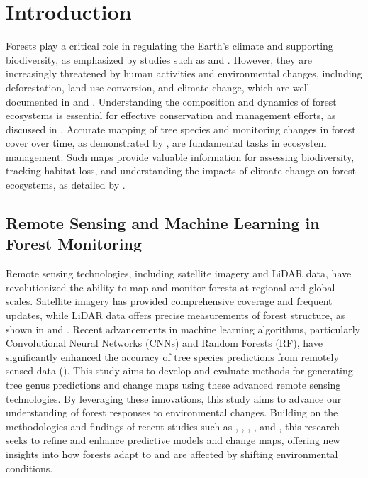 \chapter{Introduction}
\label{chapter:intro}

Forests play a critical role in regulating the Earth's climate and supporting biodiversity, as emphasized by studies such as \cite{bonan2008forests} and \cite{watson2018intact}. However, they are increasingly threatened by human activities and environmental changes, including deforestation, land-use conversion, and climate change, which are well-documented in \cite{fao2020gfra} and \cite{hansen2013forestcover}. Understanding the composition and dynamics of forest ecosystems is essential for effective conservation and management efforts, as discussed in \cite{turner2003remotesensing}. Accurate mapping of tree species and monitoring changes in forest cover over time, as demonstrated by \cite{sexton2013treecover}, are fundamental tasks in ecosystem management. Such maps provide valuable information for assessing biodiversity, tracking habitat loss, and understanding the impacts of climate change on forest ecosystems, as detailed by \cite{vose2018forests}.

\section{Remote Sensing and Machine Learning in Forest Monitoring}

Remote sensing technologies, including satellite imagery and LiDAR data, have revolutionized the ability to map and monitor forests at regional and global scales. Satellite imagery has provided comprehensive coverage and frequent updates, while LiDAR data offers precise measurements of forest structure, as shown in \cite{pettorelli2016satellite} and \cite{lefsky2002lidar}. Recent advancements in machine learning algorithms, particularly Convolutional Neural Networks (CNNs) and Random Forests (RF), have significantly enhanced the accuracy of tree species predictions from remotely sensed data (\cite{zheng2019deep, breiman2001random}). This study aims to develop and evaluate methods for generating tree genus predictions and change maps using these advanced remote sensing technologies. By leveraging these innovations, this study aims to advance our understanding of forest responses to environmental changes. Building on the methodologies and findings of recent studies such as \cite{hansen2013forestcover}, \cite{belgium_classification}, \cite{pakistan}, \cite{copernicus_main}, and \cite{germany_bavaria}, this research seeks to refine and enhance predictive models and change maps, offering new insights into how forests adapt to and are affected by shifting environmental conditions.

